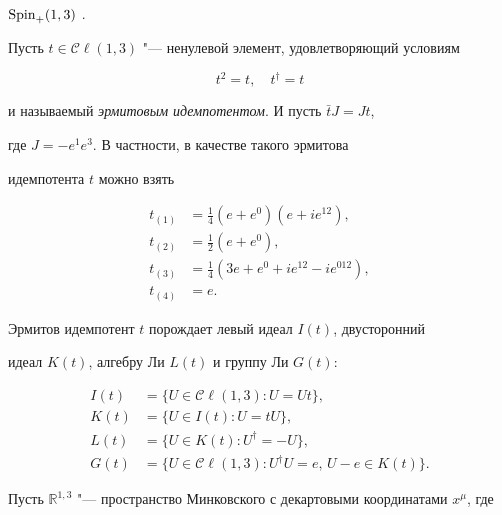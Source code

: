 ${\rm Spin}_+(1, 3)$ \cite{marchuk11:4}.



Пусть $t\in{\mathcal{C\!\ell}}(1, 3)$ "--- ненулевой элемент,  удовлетворяющий условиям

\begin{equation}

\label{marchuk11:eq1}

t^2=t, \quad t^\dagger=t

\end{equation}

и называемый {\em эрмитовым идемпотентом}. И пусть $\bar t J=J t$, 

где $J=-e^1e^3$. В частности,  в качестве такого эрмитова

идемпотента $t$ можно взять

\begin{align*}

t_{(1)}&= \frac{1}{4}(e+e^0)(e+i e^{12}), \\

t_{(2)}&= \frac{1}{2}(e+e^0), \\

t_{(3)}&= \frac{1}{4}(3e+e^0+ie^{12}-ie^{012}), \\

t_{(4)}&= e.

\end{align*}



Эрмитов идемпотент $t$ порождает левый идеал $I(t)$,  двусторонний

идеал $K(t)$,  алгебру Ли $L(t)$ и группу Ли $G(t)$:

\begin{align}

\label{marchuk11:eq2}

I(t) &= \{U\in{\mathcal{C\!\ell}}(1, 3) : U=U t\}, \nonumber\\

K(t) &= \{U\in I(t) : U=t U\}, \\

L(t) &= \{U\in K(t) : U^\dagger =-U\}, \nonumber\\

G(t) &= \{U\in{\mathcal{C\!\ell}}(1, 3) : U^\dagger U=e, \,U-e\in K(t)\}\nonumber.

\end{align}



Пусть ${\mathbb R}^{1, 3}$ "--- пространство Минковского с декартовыми координатами $x^\mu$,  где

